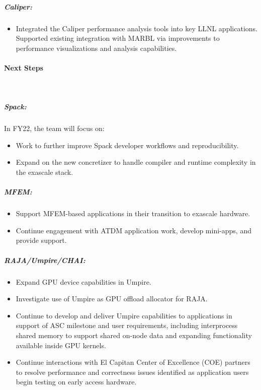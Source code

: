 \subparagraph{Caliper:}
\begin{itemize}
\item Integrated the Caliper performance analysis tools into key LLNL applications. Supported existing integration with MARBL via improvements to performance visualizations and analysis capabilities.
\end{itemize}


\paragraph{Next Steps} \leavevmode \\

\subparagraph{Spack:}
In FY22, the team will focus on:

\begin{itemize}
    \item Work to further improve Spack developer workflows and reproducibility.
    \item Expand on the new concretizer to handle compiler and runtime complexity in the exascale stack.
\end{itemize}

\subparagraph{MFEM:}
\begin{itemize}
\item Support MFEM-based applications in their transition to exascale hardware.
\item Continue engagement with ATDM application work, develop mini-apps, and provide support.
\end{itemize}

\subparagraph{RAJA/Umpire/CHAI:}


\begin{itemize}
\item Expand GPU device capabilities in Umpire.
\item Investigate use of Umpire as GPU offload allocator for RAJA.
\item Continue to develop and deliver Umpire capabilities to applications in support of ASC milestone and user requirements, including interprocess shared memory to support shared on-node data and expanding functionality available inside GPU kernels.
\item Continue interactions with El Capitan Center of Excellence (COE) partners to resolve performance and correctness issues identified as application users begin testing on early access hardware.

\end{itemize}

